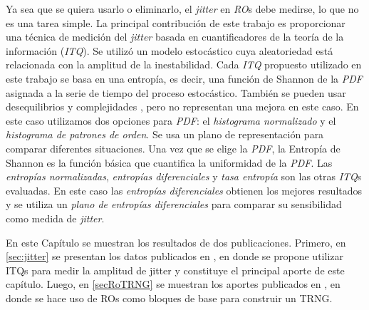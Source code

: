Ya sea que se quiera usarlo o eliminarlo, el \textit{jitter} en \emph{RO}s debe medirse, lo que no es una tarea simple.
La principal contribución de este trabajo es proporcionar una técnica de medición del \textit{jitter} basada en cuantificadores de la teoría de la información (\emph{ITQ}).
Se utilizó un modelo estocástico cuya aleatoriedad está relacionada con la amplitud de la inestabilidad.
Cada \emph{ITQ} propuesto utilizado en este trabajo se basa en una entropía, es decir, una función de Shannon de la \emph{PDF} asignada a la serie de tiempo del proceso estocástico.
También se pueden usar desequilibrios y complejidades \cite{Amigo2005,Rosso2007B}, pero no representan una mejora en este caso.
En este caso utilizamos dos opciones para \emph{PDF}: el \emph{histograma normalizado} y el \emph{histograma de patrones de orden}.
Se usa un plano de representación para comparar diferentes situaciones.
Una vez que se elige la \emph{PDF}, la Entropía de Shannon es la función básica que cuantifica la uniformidad de la \emph{PDF}.
Las \emph{entropías normalizadas}, \emph{entropías diferenciales} y \emph{tasa entropía} son las otras \emph{ITQ}s evaluadas.
En este caso las \emph{entropías diferenciales} obtienen los mejores resultados y se utiliza un \emph{plano de entropías diferenciales} para comparar su sensibilidad como medida de \textit{jitter}.

En este Capítulo se muestran los resultados de dos publicaciones.
Primero, en \ref{sec:jitter} se presentan los datos publicados en \cite{Antonelli2017}, en donde se propone utilizar ITQs para medir la amplitud de jitter y constituye el principal aporte de este capítulo.
Luego, en \ref{secRoTRNG} se muestran los aportes publicados en \cite{SPL2014}, en donde se hace uso de ROs como bloques de base para construir un TRNG.
